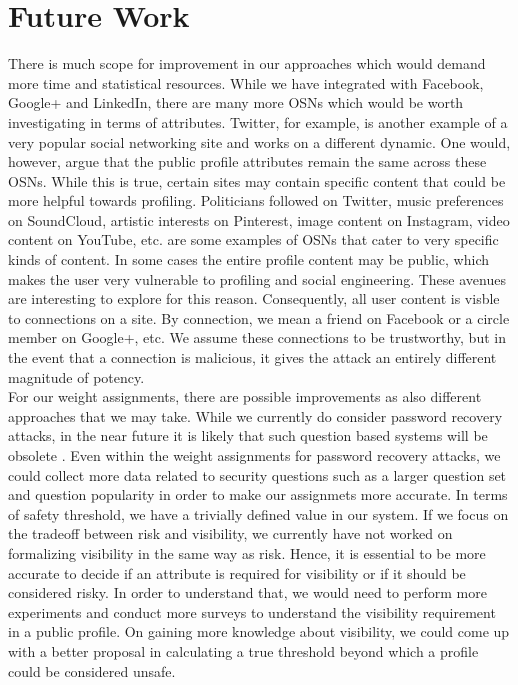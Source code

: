 \documentclass[10pt,conference]{IEEEtran}
\begin{document}
\section{Future Work}
There is much scope for improvement in our approaches which would demand more time and statistical resources. While we have integrated with Facebook, Google+ and LinkedIn, there are many more OSNs which would be worth investigating in terms of attributes. Twitter, for example, is another example of a very popular social networking site and works on a different dynamic. One would, however, argue that the public profile attributes remain the same across these OSNs. While this is true, certain sites may contain specific content that could be more helpful towards profiling. Politicians followed on Twitter, music preferences on SoundCloud, artistic interests on Pinterest, image content on Instagram, video content on YouTube, etc. are some examples of OSNs that cater to very specific kinds of content. In some cases the entire profile content may be public, which makes the user very vulnerable to profiling and social engineering. These avenues are interesting to explore for this reason. Consequently, all user content is visble to connections on a site. By connection, we mean a friend on Facebook or a circle member on Google+, etc. We assume these connections to be trustworthy, but in the event that a connection is malicious, it gives the attack an entirely different magnitude of potency.\\

For our weight assignments, there are possible improvements as also different approaches that we may take. While we currently do consider password recovery attacks, in the near future it is likely that such question based systems will be obsolete \cite{google}. Even within the weight assignments for password recovery attacks, we could collect more data related to security questions such as a larger question set and question popularity in order to make our assignmets more accurate. In terms of safety threshold, we have a trivially defined value in our system. If we focus on the tradeoff between risk and visibility, we currently have not worked on formalizing visibility in the same way as risk. Hence, it is essential to be more accurate to decide if an attribute is required for visibility or if it should be considered risky. In order to understand that, we would need to perform more experiments and conduct more surveys to understand the visibility requirement in a public profile. On gaining more knowledge about visibility, we could come up with a better proposal in calculating a true threshold beyond which a profile could be considered unsafe.\\
\end{document}
